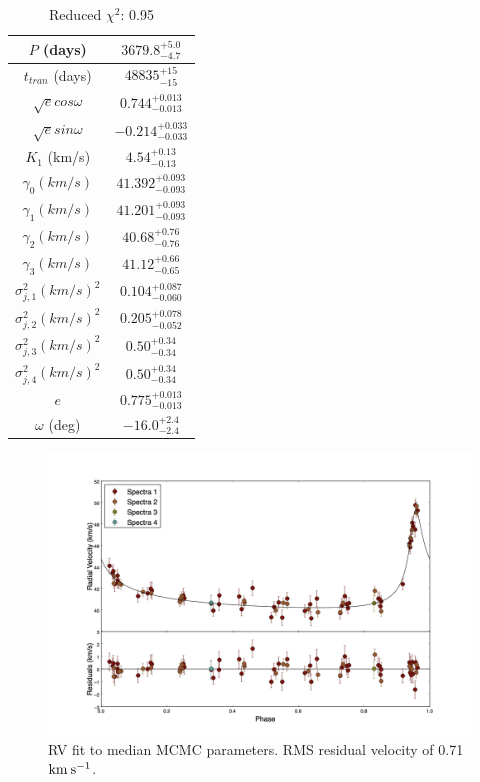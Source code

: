 \documentclass{article}
\begin{document}
\begin{table}
\centering
\caption{Reduced $\chi^2$: 0.95}
\begin{tabular}{| c | c |}
\hline
$P$ (days) & $3679.8^{+5.0}_{-4.7}$ \\
\hline
$t_{tran}$ (days) & $48835^{+15}_{-15}$ \\
\hline
$\sqrt{e} cos\omega$ & $0.744^{+0.013}_{-0.013}$ \\
\hline
$\sqrt{e} sin\omega$ & $-0.214^{+0.033}_{-0.033}$ \\
\hline
$K_1$ (km/s) & $4.54^{+0.13}_{-0.13}$ \\
\hline
$\gamma_{0} (km/s)$ & $41.392^{+0.093}_{-0.093}$ \\
\hline
$\gamma_{1} (km/s)$ & $41.201^{+0.093}_{-0.093}$ \\
\hline
$\gamma_{2} (km/s)$ & $40.68^{+0.76}_{-0.76}$ \\
\hline
$\gamma_{3} (km/s)$ & $41.12^{+0.66}_{-0.65}$ \\
\hline
$\sigma^2_{j,1} (km/s)^2$ & $0.104^{+0.087}_{-0.060}$ \\
\hline
$\sigma^2_{j,2} (km/s)^2$ & $0.205^{+0.078}_{-0.052}$ \\
\hline
$\sigma^2_{j,3} (km/s)^2$ & $0.50^{+0.34}_{-0.34}$ \\
\hline
$\sigma^2_{j,4} (km/s)^2$ & $0.50^{+0.34}_{-0.34}$ \\
\hline
$e$ & $0.775^{+0.013}_{-0.013}$ \\
\hline
$\omega$ (deg) & $-16.0^{+2.4}_{-2.4}$ \\
\hline
\end{tabular}
\end{table}

\begin{figure}[!htb]
\centering
\includegraphics[width=\textwidth]{RVfit_100000_gammas.jpg}
\caption{RV fit to median MCMC parameters. RMS residual velocity of 0.71$\rm{km \: s^{-1}}$.}
\end{figure}
\end{document}
